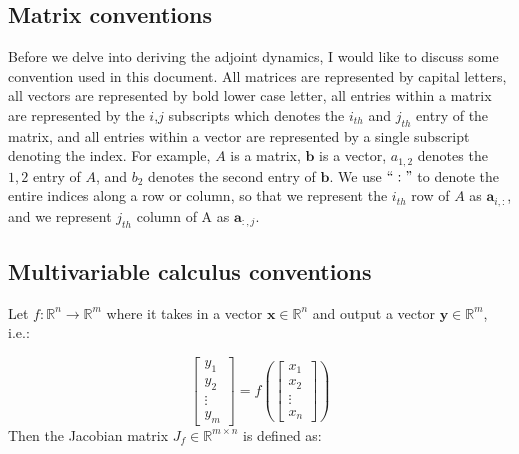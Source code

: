 \documentclass{article}
\begin{document}
\subsection{Matrix conventions}
Before we delve into deriving the adjoint dynamics, I would like to discuss some convention used in this document. All matrices are represented by capital letters, all vectors are represented by bold lower case letter, all entries within a matrix are represented by the $i$,$j$ subscripts which denotes the $i_{th}$ and $j_{th}$ entry of the matrix, and all entries within a vector are represented by a single subscript denoting the index. For example, $A$ is a matrix, $\mathbf{b}$ is a vector, $a_{1, 2}$ denotes the $1, 2$ entry of $A$, and $b_{2}$ denotes the second entry of $\mathbf{b}$. We use $``:"$ to denote the entire indices along a row or column, so that we represent the $i_{th}$ row of $A$ as $\mathbf{a}_{i,:}$, and we represent $j_{th}$ column of A as $\mathbf{a}_{:,j}$.

\subsection{Multivariable calculus conventions}
 
Let $f: \mathbb{R}^{n} \rightarrow \mathbb{R}^{m}$ where it takes in a vector $\mathbf{x} \in\mathbb{R}^{n}$ and output a vector $\mathbf{y} \in\mathbb{R}^{m}$, i.e.:

\begin{equation}
\begin{bmatrix}
    y_{1}       \\
    y_{2}      \\
    \vdots \\
    y_{m}      
\end{bmatrix}
= f(
\begin{bmatrix}
    x_{1} \\
    x_{2} \\
    \vdots \\
    x_{n} 
\end{bmatrix}
)
\end{equation}
Then the Jacobian matrix $J_{f} \in \mathbb{R}^{m\times n}$ is defined as:
\end{document}

